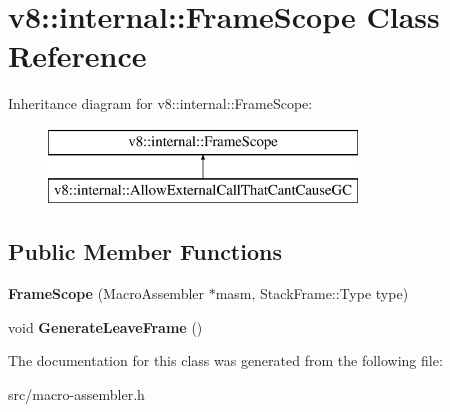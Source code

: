 \hypertarget{classv8_1_1internal_1_1_frame_scope}{}\section{v8\+:\+:internal\+:\+:Frame\+Scope Class Reference}
\label{classv8_1_1internal_1_1_frame_scope}
Inheritance diagram for v8\+:\+:internal\+:\+:Frame\+Scope\+:\begin{figure}[H]
\begin{center}
\leavevmode
\includegraphics[height=2.000000cm]{classv8_1_1internal_1_1_frame_scope}
\end{center}
\end{figure}
\subsection*{Public Member Functions}
\begin{DoxyCompactItemize}
\item 
\hypertarget{classv8_1_1internal_1_1_frame_scope_aadd215270522f8ed1e3b0ae864be3df9}{}{\bfseries Frame\+Scope} (Macro\+Assembler $\ast$masm, Stack\+Frame\+::\+Type type)\label{classv8_1_1internal_1_1_frame_scope_aadd215270522f8ed1e3b0ae864be3df9}

\item 
\hypertarget{classv8_1_1internal_1_1_frame_scope_a9f06dab495ac41ce64f39d55a79452d4}{}void {\bfseries Generate\+Leave\+Frame} ()\label{classv8_1_1internal_1_1_frame_scope_a9f06dab495ac41ce64f39d55a79452d4}

\end{DoxyCompactItemize}


The documentation for this class was generated from the following file\+:\begin{DoxyCompactItemize}
\item 
src/macro-\/assembler.\+h\end{DoxyCompactItemize}
